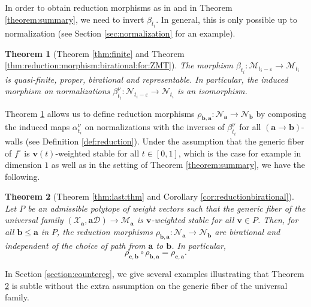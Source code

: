 \documentclass[11pt]{amsart}
\newtheorem{theorem}{Theorem}[section]
\theoremstyle{definition}
\theoremstyle{remark}
\newcommand{\calX}{\mathcal X}
\newcommand{\calD}{\mathcal D}
\newcommand{\sM}{\mathscr{M}}
\newcommand{\sN}{\mathscr{N}}
\newcommand{\bfa}{\mathbf{a}}
\newcommand{\bfv}{\mathbf{v}}
\newcommand{\bfb}{\mathbf{b}}
\newcommand{\bfc}{\mathbf{c}}
\begin{document}
	In order to obtain reduction morphisms as in \cite{Hassett} and in Theorem \ref{theorem:summary}, we need to invert $\beta_{t_i}$. In general, this is only possible up to normalization (see Section \ref{sec:normalization} for an example). 
	
	\begin{theorem}[Theorem \ref{thm:finite} and Theorem \ref{thm:reduction:morphism:birational:for:ZMT}]\label{thm:normintro} The morphism $\beta_{t_i} : \sM_{t_i - \varepsilon} \to \sM_{t_i}$ is quasi-finite, proper, birational and representable. In particular, the induced morphism on normalizations $\beta_{t_i}^\nu : \sN_{t_i - \varepsilon} \to \sN_{t_i}$ is an isomorphism. 
	\end{theorem}
	
	Theorem \ref{thm:normintro} allows us to define reduction morphisms $\rho_{\bfb, \bfa} : \sN_{\bfa} \to \sN_{\bfb}$ by composing the induced maps $\alpha_{t_i}^\nu$ on normalizations with the inverses of $\beta_{t_i}^\nu$ for all $(\bfa \to \bfb)$-walls (see Definition \ref{def:reduction}). Under the assumption that the generic fiber of $f^\circ$ is $\bfv(t)$-weighted stable for all $t \in [0,1]$, which is the case for example in dimension $1$ as well as in the setting of Theorem \ref{theorem:summary}, we have the following. 
	
	\begin{theorem}[Theorem \ref{thm:last:thm} and Corollary \ref{cor:reductionbirational}]\label{thm:introbir} Let $P$ be an admissible polytope of weight vectors such  that the generic fiber of the universal family $(\calX_\bfa, \bfa \calD) \to \sM_\bfa$ is $\bfv$-weighted stable for all $\bfv \in P$. Then, for all $\bfb \le \bfa$ in $P$, the reduction morphisms $\rho_{\bfb, \bfa}: \sN_{\bfa} \to \sN_{\bfb}$ are birational and independent of the choice of path from $\bfa$ to $\bfb$. In particular, $$
		\rho_{\bfc, \bfb} \circ \rho_{\bfb, \bfa} = \rho_{\bfc, \bfa}. 
		$$
	\end{theorem}
	
	In Section \ref{section:countereg}, we give several examples illustrating that Theorem \ref{thm:introbir} is subtle without the extra assumption on the generic fiber of the universal family. 
	
	
	
	
	
	
	
\end{document}
